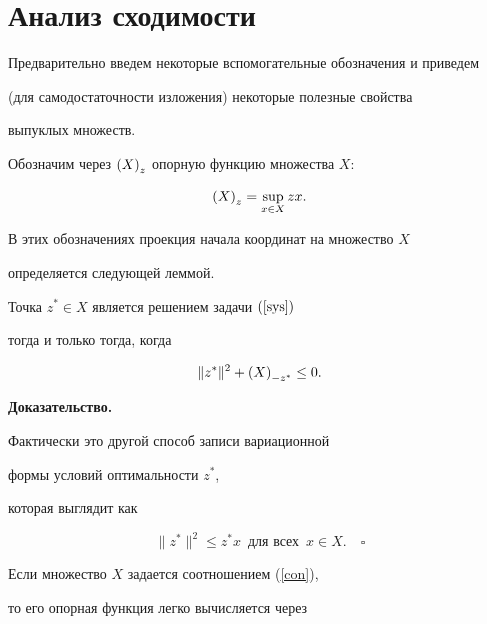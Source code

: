 \section{Анализ сходимости}





Предварительно введем некоторые вспомогательные обозначения и приведем


(для самодостаточности изложения) некоторые полезные свойства


выпуклых множеств.





Обозначим через $\left({X}\right)_{z}$ опорную функцию множества $X$:


$$


\sP{X}{z} = \sup_{x \in X} zx.


$$


В этих обозначениях проекция начала координат на множество $X$


определяется следующей леммой.





\begin{lem}\label{noc}


Точка $z^\ast \in X$ является решением задачи $(\ref{sys})$


тогда и только тогда, когда


$$


\|z^\ast\|^2 + \sP{X}{-{z^\ast}} \leq 0.


$$


\end{lem}





{\bf Доказательство.}


Фактически это другой способ записи вариационной 


формы условий оптимальности $z^\ast$,


которая выглядит как


$$\| z^\ast \|^2 \leq z^\ast x \ \; \text{для всех} \ \; x \in X.


\quad\square


$$


\medskip





Если множество $X$ задается соотношением (\ref{con}), 


то его опорная функция легко вычисляется через


